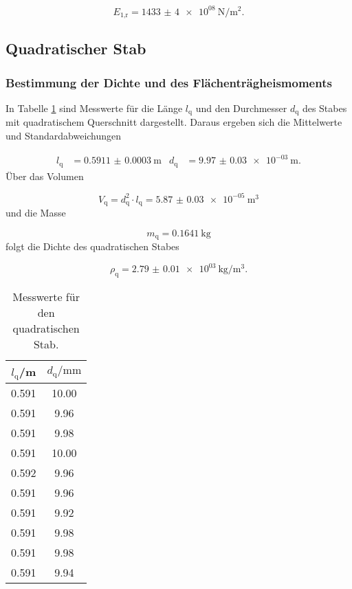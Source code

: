 \begin{equation}
  E_\text{1,r} = \SI{1433(4)e08}{\newton\per\meter\squared}.
\end{equation}

\subsection{Quadratischer Stab}

\subsubsection{Bestimmung der Dichte und des Flächenträgheismoments}

In Tabelle \ref{tab:Dichtequad} sind Messwerte für die Länge $l_\text{q}$ und
den Durchmesser $d_\text{q}$ des Stabes mit
quadratischem Querschnitt dargestellt.
Daraus ergeben sich die Mittelwerte und Standardabweichungen

\begin{align}
  l_\text{q} & = \SI{0.5911(3)}{\meter} & d_\text{q} & = \SI{9.97(3)e-03}{\meter}.
\end{align}
Über das Volumen

\begin{equation}
  V_\text{q} = d_\text{q}^2 \cdot l_\text{q} = \SI{5.87(3)e-05}{\cubic\meter}
\end{equation}
und die Masse

\begin{equation}
  m_\text{q} = \SI{0.1641}{\kilo\gram}
\end{equation}
folgt die Dichte des quadratischen Stabes

\begin{equation}
  \rho_\text{q} = \SI{2.79(1)e03}{\kilo\gram\per\cubic\meter}.
\end{equation}

\begin{table}[H]
  \centering
  \caption{Messwerte für den quadratischen Stab.}
  \label{tab:Dichtequad}
  \begin{tabular}{c c}
    \toprule
    $l_\text{q}$/\si{\meter} & $d_\text{q}/\si{\milli\meter}$ \\
    \midrule
    0.591 & 10.00 \\
    0.591 & 9.96 \\
    0.591 & 9.98 \\
    0.591 & 10.00 \\
    0.592 & 9.96 \\
    0.591 & 9.96 \\
    0.591 & 9.92 \\
    0.591 & 9.98 \\
    0.591 & 9.98 \\
    0.591 & 9.94 \\
    \bottomrule
  \end{tabular}
\end{table}


